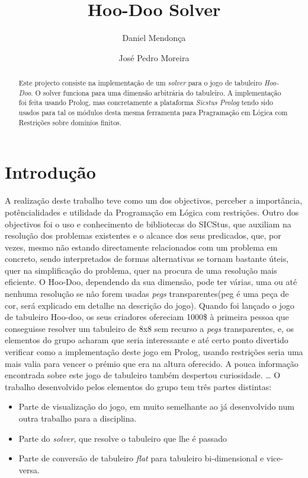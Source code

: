 \documentclass{llncs}
\begin{document}
\title{Hoo-Doo Solver}

\author{Daniel Mendon\c{c}a \and Jos\'{e} Pedro Moreira}


\maketitle
%
\begin{abstract}
Este projecto consiste na implementa\c{c}\~{a}o de um \textit{solver} para o jogo de tabuleiro \textit{Hoo-Doo}. O solver funciona para uma dimens\~{a}o arbitr\'{a}ria do tabuleiro. A implementa\c{c}\~{a}o foi feita usando Prolog, mas concretamente a plataforma \emph{Sicstus Prolog}  tendo sido usados para tal os m\'{o}dulos desta mesma ferramenta para Pragrama\c{c}\~{a}o em L\'{o}gica com Restri\c{c}\~{o}es sobre dom\'{i}nios finitos.
\end{abstract}
%
\section{Introdu\c{c}\~{a}o}
%
A realiza\c{c}\~{a}o deste trabalho teve como um dos objectivos, perceber a import\^{a}ncia, pot\^{e}ncialidades e utilidade da Programa\c{c}\~{a}o em L\'{o}gica com restri\c{c}\~{o}es. Outro dos objectivos foi o uso e conhecimento de bibliotecas do SICStus, que auxiliam na resolu\c{c}\~{a}o dos problemas existentes e o alcance dos seus predicados, que, por vezes, mesmo n\~{a}o estando directamente relacionados com um problema em concreto, sendo interpretados de formas alternativas se tornam bastante \'{u}teis, quer na simplifica\c{c}\~{a}o do problema, quer na procura de uma resolu\c{c}\~{a}o mais eficiente.
O Hoo-Doo, dependendo da sua dimens\~{a}o, pode ter v\'{a}rias, uma ou at\'{e} nenhuma resolu\c{c}\~{a}o se n\~{a}o forem usadas \emph{pegs} transparentes(peg \'{e} uma pe\c{c}a de cor, ser\'{a} explicado em detalhe na descri\c{c}\~{a}o do jogo). Quando foi lan\c{c}ado o jogo de tabuleiro Hoo-doo, os seus criadores ofereciam 1000\$ \`{a} primeira pessoa que conseguisse resolver um tabuleiro de 8x8 sem recurso a \emph{pegs} transparentes, e, os elementos do grupo acharam que seria interessante e at\'{e} certo ponto divertido verificar como a implementa\c{c}\~{a}o deste jogo em Prolog, usando restri\c{c}\~{o}es seria uma mais valia para vencer o pr\'{e}mio que era na altura oferecido. A pouca informa\c{c}\~{a}o encontrada sobre este jogo de tabuleiro tamb\'{e}m despertou curiosidade.
 \dots
 O trabalho desenvolvido pelos elementos do grupo tem três partes distintas:
 \begin{itemize}
\item Parte de visualiza\c{c}\~{a}o do jogo, em muito semelhante ao j\'{a} desenvolvido num outra trabalho para a disciplina.
\item Parte do \emph{solver}, que resolve o tabuleiro que lhe \'{e} passado
\item Parte de convers\~{a}o de tabuleiro \emph{flat} para tabuleiro bi-dimensional e vice-versa.
\end{itemize}
\end{document}
